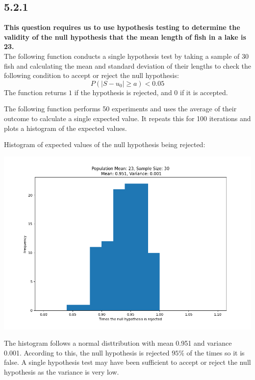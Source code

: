 \documentclass[answers]{exam}
\begin{document}
\subsection*{5.2.1}
\textbf{This question requires us to use hypothesis testing to determine the validity of the null hypothesis that the mean length of fish in a lake is 23.}\\
The following function conducts a single hypothesis test by taking a sample of $30$ fish and calculating the mean and standard deviation of their lengths to check the following condition to accept or reject the null hypothesis:
\[P(|S - u_0| \geq a) < 0.05\]
The function returns $1$ if the hypothesis is rejected, and $0$ if it is accepted.

The following function performs 50 experiments and uses the average of their outcome to calculate a single expected value. It repeats this for 100 iterations and plots a histogram of the expected values.

Histogram of expected values of the null hypothesis being rejected:
\begin{center}
  \includegraphics[scale = 0.5]{Q5_histograms/Q5.2.1.png}
\end{center}
The histogram follows a normal disttribution with mean 0.951 and variance 0.001. According to this, the null hypothesis is rejected $95\%$ of the times so it is false. A single hypothesis test may have been sufficient to accept or reject the null hypothesis as the variance is very low.
\end{document}
